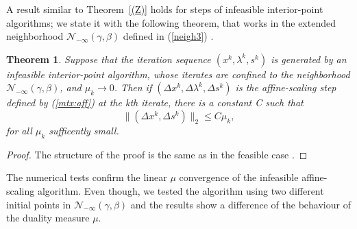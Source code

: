 \documentclass[a4paper,10 pt,titlepage,twoside]{report}
\theoremstyle{plain}
\newtheorem{thm}{Theorem}[chapter]
\theoremstyle{definition}
\theoremstyle{remark}
\begin{document}
A result similar to Theorem~\ref{(Z)} holds for steps of infeasible interior-point algorithms; we state it with the following theorem, that works in the extended neighborhood $\mathcal{N}_{-\infty}(\gamma,\beta)$ defined in (\ref{neigh3}) \cite{Wright}.\\
\begin{thm}
	Suppose that the iteration sequence $(x^{k},\lambda^{k},s^{k})$ is generated by an infeasible interior-point algorithm, whose iterates are confined to the neighborhood $\mathcal{N}_{-\infty}(\gamma,\beta)$, and $\mu_{k}\to 0$. Then if $(\Delta x^{k},\Delta \lambda^{k},\Delta s^{k})$ is the affine-scaling step defined by (\ref{mtx:aff}) at the kth iterate, there is a constant C such that
	\begin{equation*}
		\lVert(\Delta x^{k},\Delta s^{k})\rVert_{2}\leq C\mu_{k},
	\end{equation*}
	for all $\mu_{k}$ sufficently small.
\end{thm}
\begin{proof}
	The structure of the proof is the same as in the feasible case \cite{Wright}.
\end{proof}
The numerical tests confirm the linear $\mu$ convergence of the infeasible affine-scaling algorithm. Even though, we tested the algorithm using two different initial points in $\mathcal{N}_{-\infty}(\gamma,\beta)$ and the results show a difference of the behaviour of the duality measure $\mu$.
\end{document}
